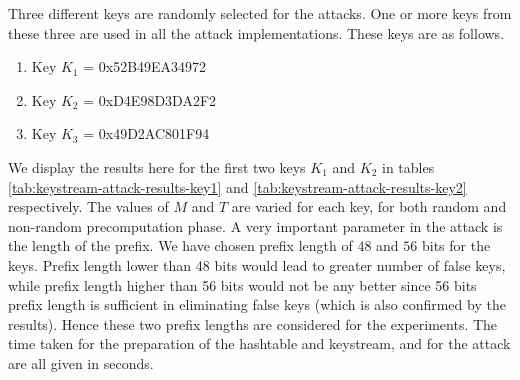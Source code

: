 Three different keys are randomly selected for the attacks. One or more keys from these three are used in all the attack implementations. These keys are as follows.

\begin{enumerate}
\item Key $K_1$ = 0x52B49EA34972
\item Key $K_2$ = 0xD4E98D3DA2F2
\item Key $K_3$ = 0x49D2AC801F94
\end{enumerate}

We display the results here for the first two keys $K_1$ and $K_2$ in tables \ref{tab:keystream-attack-results-key1} and \ref{tab:keystream-attack-results-key2} respectively. The values of $M$ and $T$ are varied for each key, for both random and non-random precomputation phase. A very important parameter in the attack is the length of the prefix. We have chosen prefix length of $48$ and $56$ bits for the keys. Prefix length lower than 48 bits would lead to greater number of false keys, while prefix length higher than 56 bits would not be any better since 56 bits prefix length is sufficient in eliminating false keys (which is also confirmed by the results). Hence these two prefix lengths are considered for the experiments. The time taken for the preparation of the hashtable and keystream, and for the attack are all given in seconds. 

